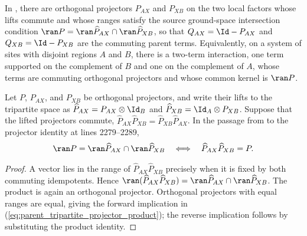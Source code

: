 \begin{definition}
    \label{def:tripartite_parent_commuting_hamiltonian}
    \leanok
    In \cite[Definition~D.2, lines 2205--2218]{Cirac2016MPDO_arXiv}, there are
    orthogonal projectors $P_{AX}$ and $P_{XB}$ on the two local factors whose
    lifts commute and whose ranges satisfy the source ground-space intersection
    condition $\ran P=\ran\widehat P_{AX}\cap\ran\widehat P_{XB}$, so that
    $Q_{AX}=\Id-P_{AX}$ and $Q_{XB}=\Id-P_{XB}$ are the commuting parent terms.
    Equivalently, on a system of sites with disjoint regions $A$ and $B$, there
    is a two-term interaction, one term supported on the complement of $B$ and
    one on the complement of $A$, whose terms are commuting orthogonal
    projectors and whose common kernel is $\ran P$.
\end{definition}

\begin{lemma}
    \label{thm:tripartite_ground_space_intersection_iff_product}
    \leanok
    Let $P$, $P_{AX}$, and $P_{XB}$ be orthogonal projectors, and write their
    lifts to the tripartite space as
    $\widehat P_{AX}=P_{AX}\otimes\Id_B$ and
    $\widehat P_{XB}=\Id_A\otimes P_{XB}$.
    Suppose that the lifted projectors commute,
    $\widehat P_{AX}\widehat P_{XB}
        =\widehat P_{XB}\widehat P_{AX}$.
    In the passage from
    \cite[Definition~D.2, lines 2205--2218]{Cirac2016MPDO_arXiv} to the
    projector identity at lines 2279--2289,
    \begin{align}
        \ran P
        =\ran\widehat P_{AX}\cap\ran\widehat P_{XB}
        \quad\Longleftrightarrow\quad
        \widehat P_{AX}\widehat P_{XB}=P.
        \label{eq:parent_tripartite_projector_product}
    \end{align}
\end{lemma}

\begin{proof}
    \leanok
    A vector lies in the range of
    $\widehat P_{AX}\widehat P_{XB}$ precisely when it is fixed by both
    commuting idempotents. Hence
    $\ran(\widehat P_{AX}\widehat P_{XB})
        =\ran\widehat P_{AX}\cap\ran\widehat P_{XB}$.
    The product is again an orthogonal projector. Orthogonal projectors with
    equal ranges are equal, giving the forward implication in
    (\ref{eq:parent_tripartite_projector_product}); the reverse implication
    follows by substituting the product identity.
\end{proof}

